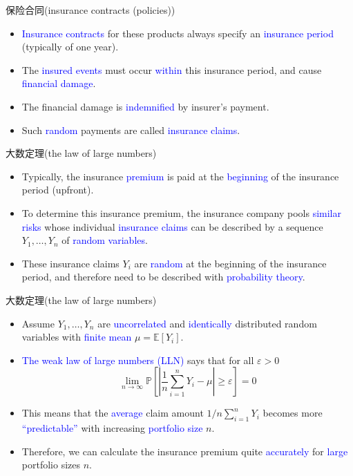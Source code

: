 \documentclass[professionalfont]{beamer}
\newcommand{\blue}[1]{\textcolor{blue}{#1}}
\begin{document}
\begin{frame}{保险合同(insurance contracts (policies))}
\begin{itemize}
\item \blue{Insurance contracts} for these products always specify an \blue{insurance period} (typically of one year). 
\item The \blue{insured events} must occur \blue{within} this insurance period, and cause \blue{financial damage}.
\item The financial damage is \blue{indemnified} by insurer's payment. 
\item Such \blue{random} payments are called \blue{insurance claims}.
\end{itemize}
\end{frame}


\begin{frame}{大数定理(the law of large numbers)}
\begin{itemize}
\item Typically, the insurance \blue{premium} is paid at the \blue{beginning} of the insurance period (upfront). 
\item To determine this insurance premium, the insurance company pools \blue{similar risks} whose individual \blue{insurance claims} can be described by a sequence $Y_1,\ldots, Y_n$ of \blue{random variables}. 
\item These insurance claims $Y_i$ are \blue{random} at the beginning of the insurance period, and therefore need to be described with \blue{probability theory}. 
\end{itemize}
\end{frame}

\begin{frame}{大数定理(the law of large numbers)}
\begin{itemize}
\item Assume $Y_1,\ldots,Y_n$ are \blue{uncorrelated} and \blue{identically} distributed random variables with \blue{finite mean} $\mu = \mathbb{E}[Y_i]$. 
\item \blue{The weak law of large numbers (LLN)} says that for all $\varepsilon>0$
\begin{equation}\label{lln}
\lim_{n\rightarrow \infty} \mathbb{P}\left[\left|\frac{1}{n}\sum_{i=1}^nY_i-\mu \right|\geq\varepsilon  \right]  =0
\end{equation}
\item This means that the \blue{average} claim amount $1/n\sum_{i=1}^nY_i$ becomes more \blue{``predictable''} with increasing \blue{portfolio size} $n$. 
\item Therefore, we can calculate the insurance premium quite \blue{accurately} for \blue{large} portfolio sizes $n$. 
\end{itemize}
\end{frame}
\end{document}
